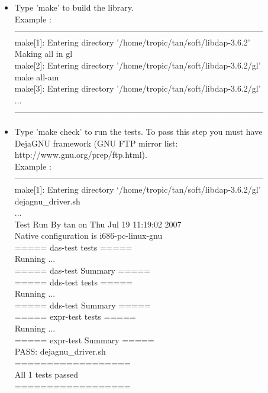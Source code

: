 \begin{itemize}
\item Type 'make' to build the library.\\
Example :\\
------------------------------------------------------------------------------------------\\
make[1]: Entering directory '/home/tropic/tan/soft/libdap-3.6.2'\\
Making all in gl\\
make[2]: Entering directory '/home/tropic/tan/soft/libdap-3.6.2/gl'\\
make  all-am\\
make[3]: Entering directory '/home/tropic/tan/soft/libdap-3.6.2/gl'\\
...\\
------------------------------------------------------------------------------------------\\
\item Type 'make check' to run the tests. To pass this step you 
must have DejaGNU framework (GNU FTP mirror list:
http://www.gnu.org/prep/ftp.html).\\
Example :\\
------------------------------------------------------------------------------------------\\
make[1]: Entering directory `/home/tropic/tan/soft/libdap-3.6.2/gl'\\
dejagnu\_driver.sh\\
...\\
Test Run By tan on Thu Jul 19 11:19:02 2007\\
Native configuration is i686-pc-linux-gnu\\
                ===== das-test tests =====\\
		Running ...\\
                ===== das-test Summary =====\\		
                ===== dds-test tests =====\\
		Running ...\\
		===== dds-test Summary =====\\
                ===== expr-test tests =====\\
		Running ...\\
                ===== expr-test Summary =====\\
PASS: dejagnu\_driver.sh\\
==================\\
All 1 tests passed\\
==================\\

\end{itemize}
